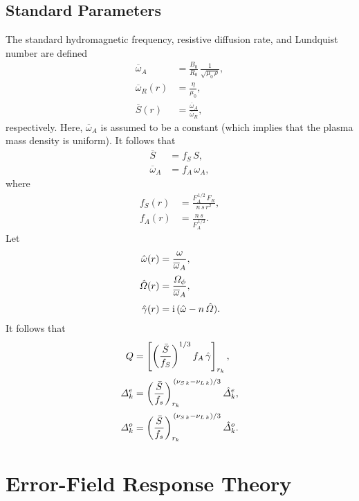 \documentclass[12pt,prb,aps,notitlepage]{revtex4-1}
\begin{document}
\subsection{Standard Parameters}
 The standard hydromagnetic frequency, resistive diffusion rate, and Lundquist number are defined
\begin{align}
\overline{\omega}_{A}& = \frac{B_0}{R_0}\,\frac{1}{\sqrt{\mu_0\,\rho}},\\[0.5ex]
\overline{\omega}_{R}(r) &= \frac{\eta}{\mu_0},\\[0.5ex]
\overline{S}(r) &= \frac{\overline{\omega}_{A}}{\overline{\omega}_{R}},
\end{align}
respectively. Here, $\overline{\omega}_{A}$ is assumed to be a constant (which implies that the plasma
mass density is uniform).
It follows that
\begin{align}
\overline{S} &= f_S\,S,\\[0.5ex]
\overline{\omega}_{A}&= f_A \,\omega_{A},
\end{align}
where
\begin{align}
f_S(r) &= \frac{F_A^{\,1/2}\,F_R}{n\,s\,r^2},\\[0.5ex]
f_A(r)&= \frac{n\,s}{F_A^{\,1/2}}.
\end{align}
Let
\begin{align}
\hat{\omega}(r)         & = \frac{\omega}{\overline{\omega}_A},\\[0.5ex]
\hat{\mit\Omega}(r) & = \frac{{\mit\Omega}_\phi}{\overline{\omega}_A},\\[0.5ex]
\hat{\gamma} (r)&= {\rm i}\,(\hat{\omega} - n\,\hat{\mit\Omega}).
\end{align}
It follows that
\begin{align}
Q &= \left[\left(\frac{\bar{S}}{f_S}\right)^{1/3} f_A\,\hat{\gamma}\right]_{r_k},\\[0.5ex]
{\mit\Delta}_k^e &= \left(\frac{\bar{S}}{f_s}\right)^{\,(\nu_{S\,k}-\nu_{L\,k})/3}_{r_k}\hat{\mit\Delta}_k^e,\\[0.5ex]
{\mit\Delta}_k^o &=\left(\frac{\bar{S}}{f_s}\right)^{\,(\nu_{S\,k}-\nu_{L\,k})/3}_{r_k}\hat{\mit\Delta}_k^o.
\end{align}

\section{Error-Field Response Theory}
\end{document}
